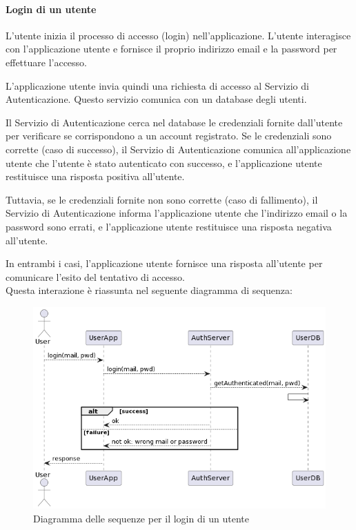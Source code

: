 \paragraph{Login di un utente}
L'utente inizia il processo di accesso (login) nell'applicazione. L'utente interagisce con l'applicazione utente e fornisce il proprio indirizzo email e la password per effettuare l'accesso.

L'applicazione utente invia quindi una richiesta di accesso al Servizio di Autenticazione. Questo servizio comunica con un database degli utenti.

Il Servizio di Autenticazione cerca nel database le credenziali fornite dall'utente per verificare se corrispondono a un account registrato. Se le credenziali sono corrette (caso di successo), il Servizio di Autenticazione comunica all'applicazione utente che l'utente è stato autenticato con successo, e l'applicazione utente restituisce una risposta positiva all'utente.

Tuttavia, se le credenziali fornite non sono corrette (caso di fallimento), il Servizio di Autenticazione informa l'applicazione utente che l'indirizzo email o la password sono errati, e l'applicazione utente restituisce una risposta negativa all'utente.

In entrambi i casi, l'applicazione utente fornisce una risposta all'utente per comunicare l'esito del tentativo di accesso.\\

Questa interazione è riassunta nel seguente diagramma di sequenza:
\begin{figure}[htbp]
    \centering
    \includegraphics[width=\textwidth]{images/login.png}
    \caption{Diagramma delle sequenze per il login di un utente}
    \label{fig:login}
\end{figure}

